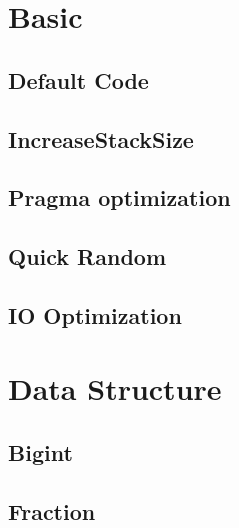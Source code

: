 \documentclass[a4paper,10pt,twocolumn,oneside]{article}
\begin{document}
\pagestyle{fancy}
\fancyfoot{}
\fancyhead[R]{\thepage}
\renewcommand{\headrulewidth}{0.4pt}
\renewcommand{\contentsname}{Contents} 

\scriptsize
\tableofcontents

\newpage

\section{Basic}
\subsection{Default Code}


\subsection{IncreaseStackSize}


\subsection{Pragma optimization}


\subsection{Quick Random}


\subsection{IO Optimization}


\section{Data Structure}
\subsection{Bigint}


\subsection{Fraction}

\end{document}
